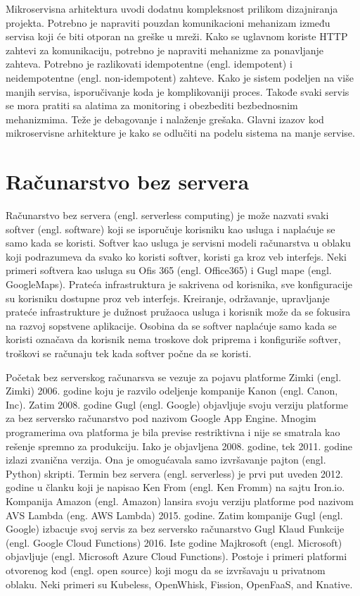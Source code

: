 \documentclass[12pt,oneside]{memoir}
\begin{document}
Mikroservisna arhitektura uvodi dodatnu kompleksnost prilikom dizajniranja projekta. Potrebno je napraviti pouzdan komunikacioni mehanizam između servisa koji će biti otporan na greške u mreži. Kako se uglavnom koriste HTTP zahtevi za komunikaciju, potrebno je napraviti mehanizme za ponavljanje zahteva. Potrebno je razlikovati idempotentne (engl. idempotent) i neidempotentne (engl. non-idempotent) zahteve. Kako je sistem podeljen na više manjih servisa, isporučivanje koda je komplikovaniji proces. Takođe svaki servis se mora pratiti sa alatima za monitoring i obezbediti bezbednosnim mehanizmima. Teže je debagovanje i nalaženje grešaka. Glavni izazov kod mikroservisne arhitekture je kako se odlučiti na podelu sistema na manje servise\cite{bm}.

\chapter{Računarstvo bez servera}
\label{chp:razrada}

Računarstvo bez servera (engl. serverless computing) je može nazvati svaki softver (engl. software) koji se isporučuje korisniku kao usluga i naplaćuje se samo kada se koristi\cite{sa}. Softver kao usluga je servisni modeli računarstva u oblaku koji podrazumeva da svako ko koristi softver, koristi ga kroz veb interfejs. Neki primeri softvera kao usluga su Ofis 365 (engl. Office365) i Gugl mape (engl. GoogleMaps). Prateća infrastruktura je sakrivena od korisnika, sve konfiguracije su korisniku dostupne proz veb interfejs. Kreiranje, održavanje, upravljanje prateće infrastrukture je dužnost pružaoca usluga i korisnik može da se fokusira na razvoj sopstvene aplikacije. Osobina da se softver naplaćuje samo kada se koristi označava da korisnik nema troskove dok priprema i konfiguriše softver, troškovi se računaju tek kada softver počne da se koristi.

Početak bez serverskog računarsva se vezuje za pojavu platforme Zimki (engl. Zimki) 2006. godine koju je razvilo odeljenje kompanije Kanon (engl. Canon, Inc). Zatim 2008. godine Gugl (engl. Google) objavljuje svoju verziju platforme za bez serversko računarstvo pod nazivom Google App Engine. Mnogim programerima ova platforma je bila previse restriktivna i nije se smatrala kao rešenje spremno za produkciju\cite{ls}. Iako je objavljena 2008. godine, tek 2011. godine izlazi zvanična verzija. Ona je omogućavala samo izvršavanje pajton (engl. Python) skripti. Termin bez servera (engl. serverless) je prvi put uveden 2012. godine u članku koji je napisao Ken From (engl. Ken Fromm) na sajtu Iron.io\cite{wtfosaais}. Kompanija Amazon (engl. Amazon) lansira svoju verziju platforme pod nazivom AVS Lambda (eng. AWS Lambda) 2015. godine. Zatim kompanije Gugl (engl. Google) izbacuje svoj servis za bez serversko računarstvo Gugl Klaud Funkcije (engl. Google Cloud Functions) 2016. Iste godine Majkrosoft (engl. Microsoft) objavljuje (engl. Microsoft Azure Cloud Functions). Postoje i primeri platformi otvorenog kod (engl. open source) koji mogu da se izvršavaju u privatnom oblaku. Neki primeri su Kubeless, OpenWhisk, Fission, OpenFaaS, and Knative\cite{ws}.
\end{document}

